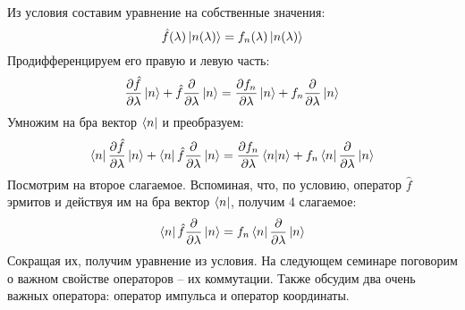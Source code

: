 Из условия составим уравнение на собственные значения:
\[
\hat f(\lambda)\ket{n(\lambda)} = f_n(\lambda)\ket{n(\lambda)}
\]
Продифференцируем его правую и левую часть:
\[
\frac{\partial \hat f}{\partial \lambda}\ket{n} + \hat f\frac{\partial}{\partial \lambda}\ket{n} = \frac{\partial f_n}{\partial \lambda}\ket{n} + f_n\frac{\partial}{\partial \lambda}\ket{n}
\]
Умножим на бра вектор $\bra{n}$ и преобразуем:
\[
\bra{n}\frac{\partial \hat f}{\partial \lambda}\ket{n} + \bra{n}\hat f\frac{\partial}{\partial \lambda}\ket{n} = \frac{\partial f_n}{\partial \lambda}\braket{n} + f_n\bra{n}\frac{\partial}{\partial \lambda}\ket{n}
\]
Посмотрим на второе слагаемое. Вспоминая, что, по условию, оператор $\hat f$ эрмитов и действуя им на бра вектор $\bra{n}$, получим 4 слагаемое:
\[
\bra{n}\hat f\frac{\partial}{\partial \lambda}\ket{n} = f_n\bra{n}\frac{\partial}{\partial \lambda}\ket{n}
\]
Сокращая их, получим уравнение из условия.
На следующем семинаре поговорим о важном свойстве операторов -- их коммутации. Также обсудим два очень важных оператора: оператор импульса и оператор координаты.